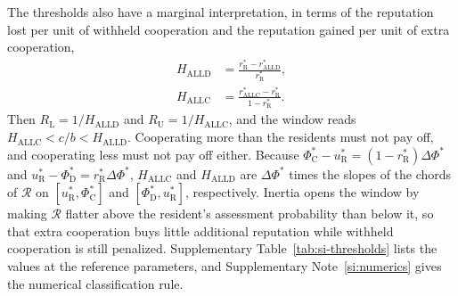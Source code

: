 \documentclass[10pt]{wlscirep}
\newcommand{\Rmap}{\mathscr{R}}            %
\newcommand{\rR}{r_{\mathrm{R}}^{*}}
\newcommand{\uR}{u_{\mathrm{R}}^{*}}
\newcommand{\PhiCs}{\Phi^{*}_{\mathrm{C}}}
\newcommand{\PhiDs}{\Phi^{*}_{\mathrm{D}}}
\newcommand{\dPhi}{\Delta\Phi^{*}}
\newcommand{\ALLC}{\mathrm{ALLC}}
\newcommand{\ALLD}{\mathrm{ALLD}}
\theoremstyle{plain}
\theoremstyle{remark}
\begin{document}
The thresholds also have a marginal interpretation, in terms of the reputation lost per unit of withheld cooperation and the reputation gained per unit of extra cooperation,
\begin{equation}
\begin{aligned}
H_{\ALLD}&=\frac{\rR-r^*_{\ALLD}}{\rR},\\[2pt]
H_{\ALLC}&=\frac{r^*_{\ALLC}-\rR}{1-\rR}.
\end{aligned}
\label{eq:s-HALL}
\end{equation}
Then $R_{\mathrm L}=1/H_{\ALLD}$ and $R_{\mathrm U}=1/H_{\ALLC}$, and the window reads $H_{\ALLC}<c/b<H_{\ALLD}$. Cooperating more than the residents must not pay off, and cooperating less must not pay off either. Because $\PhiCs-\uR=(1-\rR)\dPhi$ and $\uR-\PhiDs=\rR\dPhi$, $H_{\ALLC}$ and $H_{\ALLD}$ are $\dPhi$ times the slopes of the chords of $\Rmap$ on $[\uR,\PhiCs]$ and $[\PhiDs,\uR]$, respectively. Inertia opens the window by making $\Rmap$ flatter above the resident's assessment probability than below it, so that extra cooperation buys little additional reputation while withheld cooperation is still penalized. Supplementary Table~\ref{tab:si-thresholds} lists the values at the reference parameters, and Supplementary Note~\ref{si:numerics} gives the numerical classification rule.
\end{document}
